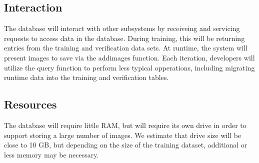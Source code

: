 \subsection{Interaction}

The database will interact with other subsystems by receiveing and servicing requests to access data in the database. During training, this will be returning entries from the training and verification data sets. At runtime, the system will present images to save via the addimages function. Each iteration, developers will utilize the query function to perform less typical opperations, including migrating runtime data into the training and verification tables.

\subsection{Resources}

The database will require little RAM, but will require its own drive in order to support storing a large number of images. We estimate that drive size will be close to 10 GB, but depending on the size of the training dataset, additional or less memory may be necessary.


